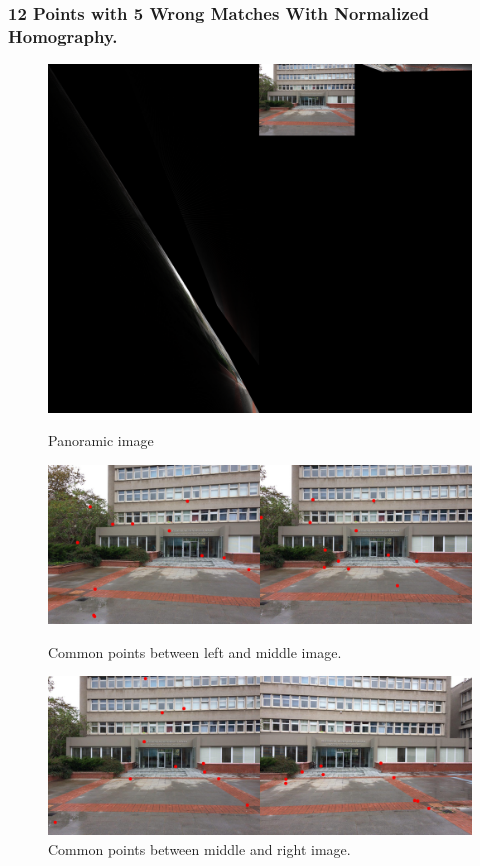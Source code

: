 \documentclass[letterpaper,12pt]{article}
\begin{document}
\subsubsection{12 Points with 5 Wrong Matches With Normalized Homography.}
\begin{figure}[!htb]
        \centering\includegraphics[width=1\columnwidth]{experiments/12points/norm/final5wrong.jpg}
          \caption{
                \label{} Panoramic image
        }
        \centering\includegraphics[width=1\columnwidth]{experiments/12points/norm/left-1_middle5wrong.jpg}
          \caption{
                \label{} Common points between left and middle image.
        }
        \centering\includegraphics[width=1\columnwidth]{experiments/12points/norm/middle_left-15wrong.jpg}
        \caption{
                \label{} Common points between middle and right image.
        }
\end{figure}
\FloatBarrier
\newpage
\end{document}
